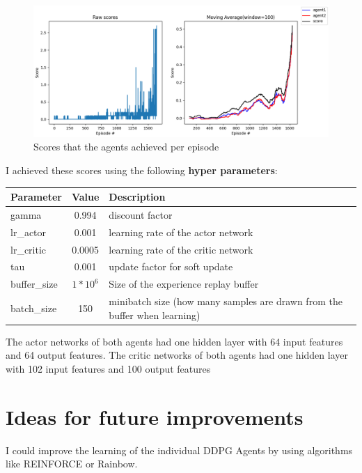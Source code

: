 \documentclass[12pt,a4paper]{article}
\begin{document}
    \begin{figure}[H]
        \includegraphics[width=\linewidth]{img/scores1}
        \caption{Scores that the agents achieved per episode}
        \label{fig:scores}
    \end{figure}
    \pagebreak
    I achieved these scores using the following \textbf{hyper parameters}:
    \begin{center}
        \begin{tabular}{||l c l||}
            \hline
            Parameter    & Value      & Description \\ [0.5ex]
            \hline\hline
            gamma        & 0.994      & discount factor                                                           \\
            \hline
            lr\_actor    & 0.001      & learning rate of the actor network                                        \\
            \hline
            lr\_critic   & 0.0005     & learning rate of the critic network                                       \\
            \hline
            tau          & 0.001      & update factor for soft update                                             \\
            \hline
            buffer\_size & $1*10^{6}$ & Size of the experience replay buffer                                      \\
            \hline
            batch\_size  & 150        & minibatch size (how many samples are drawn from the buffer when learning) \\
            \hline
        \end{tabular}
    \end{center}

    The actor networks of both agents had one hidden layer with 64 input features and 64 output features.
    The critic networks of both agents had one hidden layer with 102 input features and 100 output features


    \section{Ideas for future improvements}\label{sec:ideas}
    I could improve the learning of the individual DDPG Agents by using algorithms like REINFORCE or Rainbow.
\end{document}
